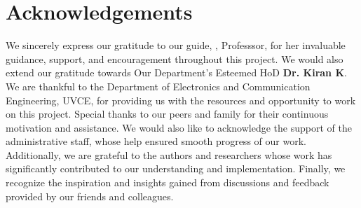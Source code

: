 \chapter*{Acknowledgements}

\vspace{10mm}

 We sincerely express our gratitude to our guide, \textbf{\guideA}, Professsor, for her invaluable guidance, support, and encouragement throughout this project. We would also extend our gratitude towards Our Department's Esteemed HoD \textbf{Dr. Kiran K}. We are thankful to the Department of Electronics and Communication Engineering, UVCE, for providing us with the resources and opportunity to work on this project. Special thanks to our peers and family for their continuous motivation and assistance. We would also like to acknowledge the support of the administrative staff, whose help ensured smooth progress of our work. Additionally, we are grateful to the authors and researchers whose work has significantly contributed to our understanding and implementation. Finally, we recognize the inspiration and insights gained from discussions and feedback provided by our friends and colleagues. 

